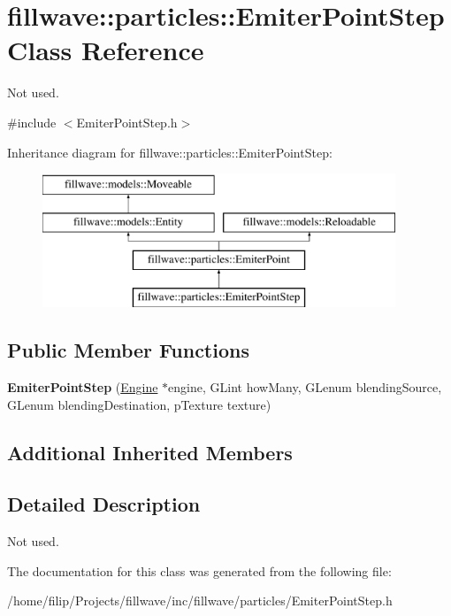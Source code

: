 \hypertarget{classfillwave_1_1particles_1_1EmiterPointStep}{}\section{fillwave\+:\+:particles\+:\+:Emiter\+Point\+Step Class Reference}
\label{classfillwave_1_1particles_1_1EmiterPointStep}


Not used.  




{\ttfamily \#include $<$Emiter\+Point\+Step.\+h$>$}

Inheritance diagram for fillwave\+:\+:particles\+:\+:Emiter\+Point\+Step\+:\begin{figure}[H]
\begin{center}
\leavevmode
\includegraphics[height=4.000000cm]{classfillwave_1_1particles_1_1EmiterPointStep}
\end{center}
\end{figure}
\subsection*{Public Member Functions}
\begin{DoxyCompactItemize}
\item 
\hypertarget{classfillwave_1_1particles_1_1EmiterPointStep_abfc1d17e500f5849ec9b4949e7bd5f54}{}{\bfseries Emiter\+Point\+Step} (\hyperlink{classfillwave_1_1Engine}{Engine} $\ast$engine, G\+Lint how\+Many, G\+Lenum blending\+Source, G\+Lenum blending\+Destination, p\+Texture texture)\label{classfillwave_1_1particles_1_1EmiterPointStep_abfc1d17e500f5849ec9b4949e7bd5f54}

\end{DoxyCompactItemize}
\subsection*{Additional Inherited Members}


\subsection{Detailed Description}
Not used. 

The documentation for this class was generated from the following file\+:\begin{DoxyCompactItemize}
\item 
/home/filip/\+Projects/fillwave/inc/fillwave/particles/Emiter\+Point\+Step.\+h\end{DoxyCompactItemize}
